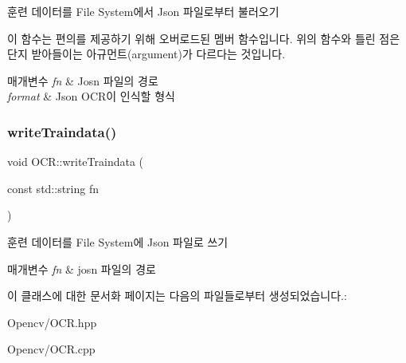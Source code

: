 훈련 데이터를 File System에서 Json 파일로부터 불러오기 

이 함수는 편의를 제공하기 위해 오버로드된 멤버 함수입니다. 위의 함수와 틀린 점은 단지 받아들이는 아규먼트(argument)가 다르다는 것입니다. 
\begin{DoxyParams}{매개변수}
{\em fn} & Josn 파일의 경로 \\
\hline
{\em format} & Json O\+C\+R이 인식할 형식 \\
\hline
\end{DoxyParams}
\mbox{\label{class_o_c_r_aac52dda47989cde2ba9c674de77bd2ce}} 
\subsubsection{\texorpdfstring{write\+Traindata()}{writeTraindata()}}
{\footnotesize\ttfamily void O\+C\+R\+::write\+Traindata (\begin{DoxyParamCaption}\item[{const std\+::string}]{fn }\end{DoxyParamCaption})\hspace{0.3cm}{\ttfamily [private]}}



훈련 데이터를 File System에 Json 파일로 쓰기 


\begin{DoxyParams}{매개변수}
{\em fn} & josn 파일의 경로 \\
\hline
\end{DoxyParams}


이 클래스에 대한 문서화 페이지는 다음의 파일들로부터 생성되었습니다.\+:\begin{DoxyCompactItemize}
\item 
Opencv/O\+C\+R.\+hpp\item 
Opencv/O\+C\+R.\+cpp\end{DoxyCompactItemize}
